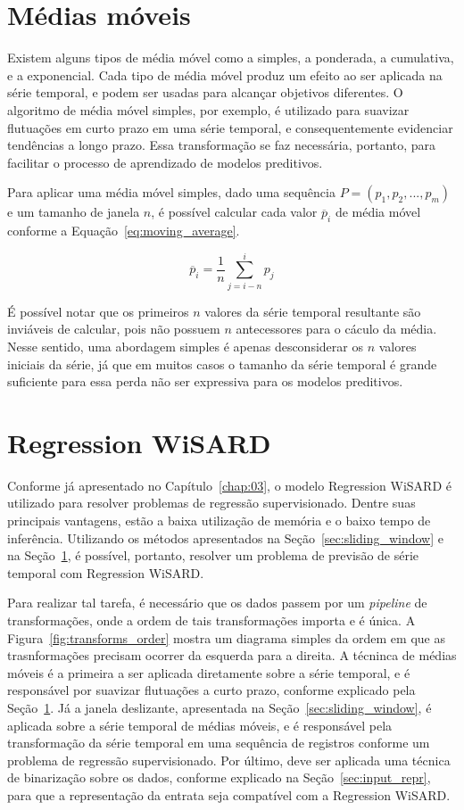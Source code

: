 \section{Médias móveis} \label{sec:moving_average}
Existem alguns tipos de média móvel como a simples, a ponderada, a cumulativa, e a exponencial. Cada tipo de média móvel produz um efeito ao ser aplicada na série temporal, e podem ser usadas para alcançar objetivos diferentes. O algoritmo de média móvel simples, por exemplo, é utilizado para suavizar flutuações em curto prazo em uma série temporal, e consequentemente evidenciar tendências a longo prazo. Essa transformação se faz necessária, portanto, para facilitar o processo de aprendizado de modelos preditivos.

Para aplicar uma média móvel simples, dado uma sequência $P = (p_{1}, p_{2}, ..., p_{m})$ e um tamanho de janela $n$, é possível calcular cada valor $\overline{p}_{i}$ de média móvel conforme a Equação~\ref{eq:moving_average}.

\begin{equation} \label{eq:moving_average}
    \overline{p}_{i} = \dfrac{1}{n}\sum ^{i}_{j=i-n}p_{j}
\end{equation}

É possível notar que os primeiros $n$ valores da série temporal resultante são inviáveis de calcular, pois não possuem $n$ antecessores para o cáculo da média. Nesse sentido, uma abordagem simples é apenas desconsiderar os $n$ valores iniciais da série, já que em muitos casos o tamanho da série temporal é grande suficiente para essa perda não ser expressiva para os modelos preditivos.

\section{Regression WiSARD}
Conforme já apresentado no Capítulo~\ref{chap:03}, o modelo Regression WiSARD é utilizado para resolver problemas de regressão supervisionado. Dentre suas principais vantagens, estão a baixa utilização de memória e o baixo tempo de inferência. Utilizando os métodos apresentados na Seção~\ref{sec:sliding_window} e na Seção~\ref{sec:moving_average}, é possível, portanto, resolver um problema de previsão de série temporal com Regression WiSARD.

Para realizar tal tarefa, é necessário que os dados passem por um \textit{pipeline} de transformações, onde a ordem de tais transformações importa e é única. A Figura~\ref{fig:transforms_order} mostra um diagrama simples da ordem em que as trasnformações precisam ocorrer da esquerda para a direita. A técninca de médias móveis é a primeira a ser aplicada diretamente sobre a série temporal, e é responsável por suavizar flutuações a curto prazo, conforme explicado pela Seção~\ref{sec:moving_average}. Já a janela deslizante, apresentada na Seção~\ref{sec:sliding_window}, é aplicada sobre a série temporal de médias móveis, e é responsável pela transformação da série temporal em uma sequência de registros conforme um problema de regressão supervisionado. Por último, deve ser aplicada uma técnica de binarização sobre os dados, conforme explicado na Seção~\ref{sec:input_repr}, para que a representação da entrata seja compatível com a Regression WiSARD.

